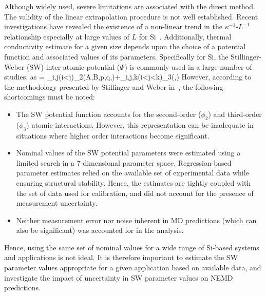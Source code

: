 Although widely used, severe limitations are associated with the direct method.
The validity of the linear extrapolation procedure is not well established. Recent
investigations have revealed the existence of a non-linear trend in the $\kappa^{-1}$-$L^{-1}$
relationship especially at large values of $L$ for Si~\cite{Sellan:2010}. Additionally, 
thermal conductivity estimate for a given size depends upon the choice of a potential
function and associated values of its parameters. Specifically for Si, the Stillinger-Weber (SW)
inter-atomic potential ($\Phi$) is commonly used in a large number of studies, as
%
\be
\Phi = \sum\limits_{i,j(i<j)}\phi_2(A,B,p,q,\alpha)\hspace{1mm}+\sum\limits_{i,j,k(i<j<k)}\phi_3(\lambda,\gamma)
\ee
%
However, according
to the methodology presented by Stillinger and Weber in~\cite{Stillinger:1985},
the following shortcomings must be noted:
%
\begin{itemize}
\item The SW potential function accounts for the second-order ($\phi_2$) and
third-order ($\phi_3$) atomic 
interactions. However, this representation can be inadequate in situations where 
higher order interactions become significant.  
\item Nominal values of the SW potential parameters were estimated using a 
limited search in a 7-dimensional parameter space. Regression-based parameter
estimates relied on the available set of experimental data while ensuring structural
stability. Hence, the estimates are tightly coupled with the set of data used for
calibration, and did not account for the presence of measurement uncertainty. 
\item Neither measurement error nor noise inherent in MD predictions (which can also be
significant) was accounted for in the analysis. 
\end{itemize}
%
Hence, using the same set of nominal values for a wide range of Si-based systems and
applications is not ideal. It is therefore important to estimate the SW parameter values
appropriate for a given application based on available data, and investigate the impact
of uncertainty in SW parameter values on NEMD predictions. 

